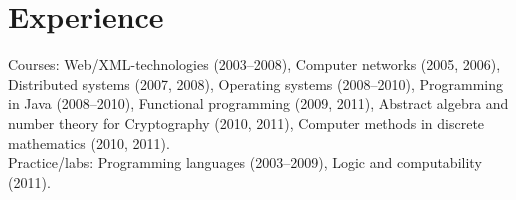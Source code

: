 \documentclass[11pt,a4paper]{moderncv}
\begin{document}
\section{Experience}
{Courses: Web/XML-technologies (2003–2008), Computer networks (2005, 2006), Distributed systems (2007, 2008), 
 Operating systems (2008–2010),  Programming in Java (2008–2010), 
Functional programming (2009, 2011), 
Abstract algebra and number theory for Cryptography (2010, 2011), 
Computer methods in discrete mathematics (2010, 2011).\\
Practice/labs: Programming languages (2003–2009), Logic and computability (2011).}


\end{document}
